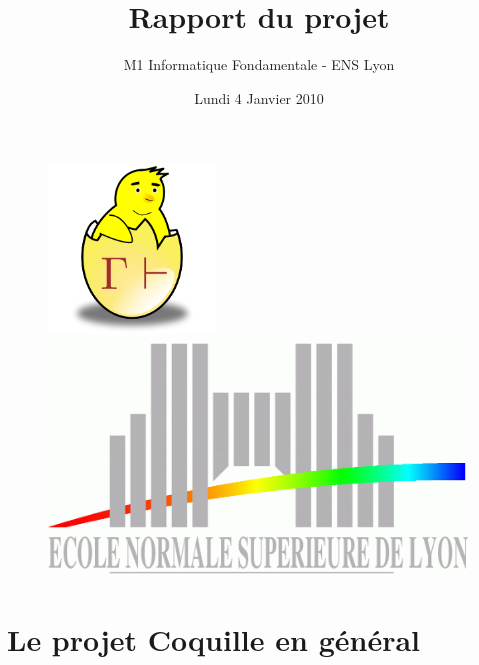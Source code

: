 \documentclass[slidetop]{beamer}
\date{Lundi 4 Janvier 2010}
\title{Rapport du projet \coquille}
\author{M1 Informatique Fondamentale - ENS Lyon}
\begin{document}
\begin{frame}[plain]
    \maketitle

    \begin{figure}[ht]
        \begin{minipage}[b]{0.4\linewidth}
            \centering
            \includegraphics[width=0.4\textwidth]{../images/common/poussin.png}
        \end{minipage}
        \hfill
        \begin{minipage}[b]{0.4\linewidth}   
            \centering
            \includegraphics[scale=0.1]{../images/common/ens.jpg}
        \end{minipage}
    \end{figure}
\end{frame}

\begin{frame}[plain]
    \tableofcontents
\end{frame}

\section{Le projet Coquille en g\'en\'eral}

\end{document}
